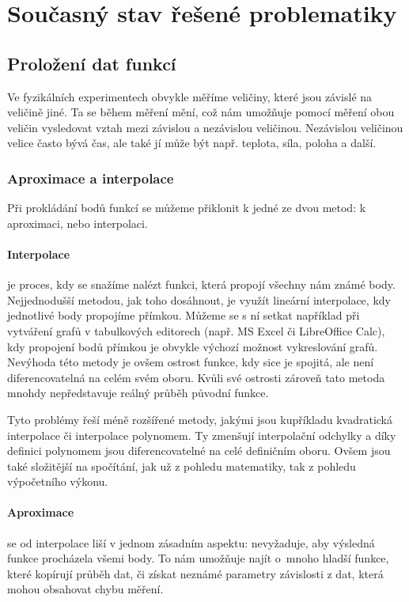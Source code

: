 \newcommand{\nsum}{\sum^n_{i=1}}
\newcommand{\nsumx}{\sum^n_{i=1}x_i}
\newcommand{\nsumy}{\sum^n_{i=1}y_i}
\newcommand{\nsumxx}{\sum^n_{i=1}x_i^2}
\newcommand{\nsumxy}{\sum^n_{i=1}x_iy_i}

\section{Současný stav řešené problematiky}
\subsection{Proložení dat funkcí}
Ve fyzikálních experimentech obvykle měříme veličiny, které jsou závislé na
veličině jiné. Ta se během měření mění, což nám umožňuje pomocí měření obou
veličin vysledovat vztah mezi závislou a nezávislou veličinou. Nezávislou
veličinou velice často bývá čas, ale také jí může být např. teplota, síla,
poloha a další.\cite{praktikum}

\subsubsection{Aproximace a interpolace}
Při prokládání bodů funkcí se můžeme přiklonit k jedné ze dvou metod: k
aproximaci, nebo interpolaci.

\paragraph{Interpolace} je proces, kdy se snažíme nalézt funkci, která propojí
všechny nám známé body. Nejjednodušší metodou, jak toho dosáhnout, je využít
lineární interpolace, kdy jednotlivé body propojíme přímkou. Můžeme se s ní
setkat například při vytváření grafů v tabulkových editorech (např. MS Excel či
LibreOffice Calc), kdy propojení bodů přímkou je obvykle výchozí možnost
vykreslování grafů. Nevýhoda této metody je ovšem ostrost funkce, kdy sice je
spojitá, ale není diferencovatelná na celém svém oboru. Kvůli své ostrosti
zároveň tato metoda mnohdy nepředstavuje reálný průběh původní funkce.

Tyto problémy řeší méně rozšířené metody, jakými jsou kupříkladu kvadratická
interpolace či interpolace polynomem. Ty zmenšují interpolační odchylky a díky
definici polynomem jsou diferencovatelné na celé definičním oboru. Ovšem jsou
také složitější na spočítání, jak už z pohledu matematiky, tak z pohledu
výpočetního výkonu.

\paragraph{Aproximace} se od interpolace liší v jednom zásadním aspektu:
nevyžaduje, aby výsledná funkce procházela všemi body. To nám umožňuje najít
o~mnoho hladší funkce, které kopírují průběh dat, či získat neznámé parametry
závislosti z dat, která mohou obsahovat chybu měření. 

